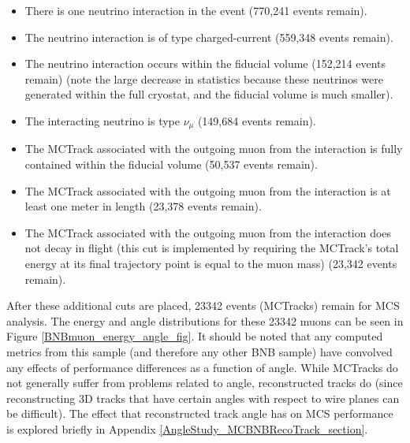 \begin{itemize}
\item There is one neutrino interaction in the event (770,241 events remain).
\item The neutrino interaction is of type charged-current (559,348 events remain).
\item The neutrino interaction occurs within the fiducial volume (152,214 events remain) (note the large decrease in statistics because these neutrinos were generated within the full cryostat, and the fiducial volume is much smaller).
\item The interacting neutrino is type $\nu_\mu$ (149,684 events remain).
\item The {\sc MCTrack} associated with the outgoing muon from the interaction is fully contained within the fiducial volume (50,537 events remain).
\item The {\sc MCTrack} associated with the outgoing muon from the interaction is at least one meter in length (23,378 events remain).
\item The {\sc MCTrack} associated with the outgoing muon from the interaction does not decay in flight (this cut is implemented by requiring the {\sc MCTrack}'s total energy at its final trajectory point is equal to the muon mass) (23,342 events remain).
\end{itemize}
After these additional cuts are placed, 23342 events ({\sc MCTracks}) remain for MCS analysis. The energy and angle distributions for these 23342 muons can be seen in Figure \ref{BNBmuon_energy_angle_fig}. It should be noted that any computed metrics from this sample (and therefore any other BNB sample) have convolved any effects of performance differences as a function of angle. While {\sc MCTracks} do not generally suffer from problems related to angle, reconstructed tracks do (since reconstructing 3D tracks that have certain angles with respect to wire planes can be difficult). The effect that reconstructed track angle has on MCS performance is explored briefly in Appendix \ref{AngleStudy_MCBNBRecoTrack_section}.\\

